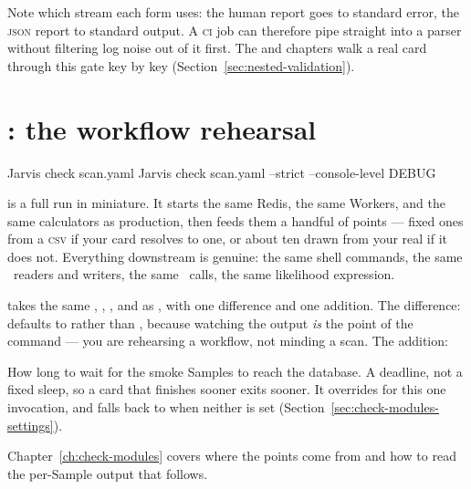 Note which stream each form uses: the human report goes to standard error, the
\textsc{json} report to standard output. A \textsc{ci} job can therefore pipe
 straight into a parser without filtering log noise out of it first. The
 and  chapters walk a real card through this gate
key by key (Section~\ref{sec:nested-validation}).

\section{: the workflow rehearsal}
\label{sec:cli-check}

\begin{terminal}
\begin{jcmd}
Jarvis check scan.yaml
Jarvis check scan.yaml --strict --console-level DEBUG
\end{jcmd}
\end{terminal}

 is a full run in miniature. It starts the same Redis, the same Workers, and
the same calculators as production, then feeds them a handful of points --- fixed ones
from a \textsc{csv} if your card resolves to one, or about ten drawn from your real
 if it does not. Everything downstream is genuine: the same
shell commands, the same \Portal\ readers and writers, the same \Operas\ calls, the same
likelihood expression.

 takes the same , ,
, and  as , with one difference and one
addition. The difference:  defaults  to 
rather than , because watching the output \emph{is} the point of the
command --- you are rehearsing a workflow, not minding a scan. The addition:

\begin{keylist}
  \item[--timeout SECONDS] How long to wait for the smoke Samples to reach the database.
        A deadline, not a fixed sleep, so a card that finishes sooner exits sooner. It
        overrides  for this one
        invocation, and falls back to  when neither is set
        (Section~\ref{sec:check-modules-settings}).
\end{keylist}

Chapter~\ref{ch:check-modules} covers where the points come from and how to read the
per-Sample output that follows.

